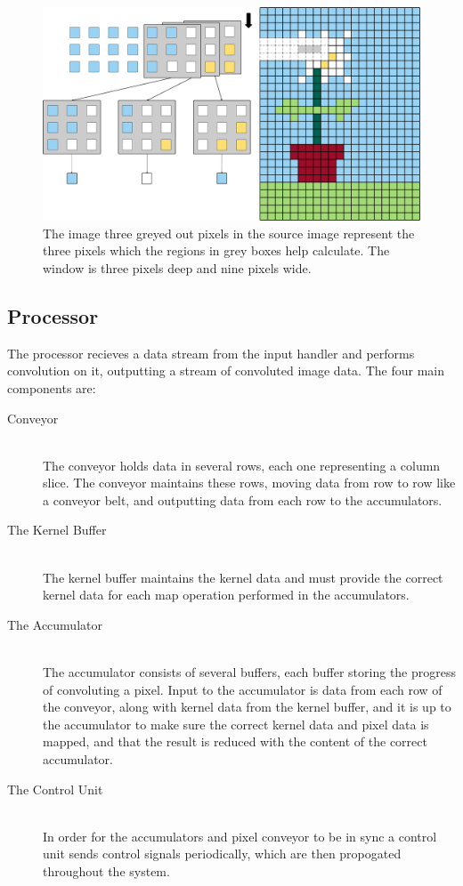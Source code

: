 \begin{figure}[h!]
    \includegraphics[width=\linewidth]{img/FeedPattern.png}
    \caption{The image three greyed out pixels in the source image represent the three pixels which the regions in grey boxes help calculate. The window is three pixels deep and nine pixels wide.}
    \label{fig:SweepFrontier}
\end{figure}

\subsection{Processor}

The processor recieves a data stream from the input handler and performs convolution on it, outputting a stream of convoluted image data.
The four main components are:
\begin{description}
    \item[Conveyor] \hfill\\ 
        The conveyor holds data in several rows, each one representing a column slice. The conveyor maintains these rows, moving data from row to row like a conveyor belt, and outputting data from each row to the accumulators.
    \item[The Kernel Buffer] \hfill\\
        The kernel buffer maintains the kernel data and must provide the correct kernel data for each map operation performed in the accumulators.
    \item[The Accumulator] \hfill\\
        The accumulator consists of several buffers, each buffer storing the progress of convoluting a pixel.
        Input to the accumulator is data from each row of the conveyor, along with kernel data from the kernel buffer, and it is up to the accumulator to make sure the correct kernel data and pixel data is mapped, and that the result is reduced with the content of the correct accumulator.
    \item[The Control Unit] \hfill\\
        In order for the accumulators and pixel conveyor to be in sync a control unit sends control signals periodically, which are then propogated throughout the system.
\end{description}

